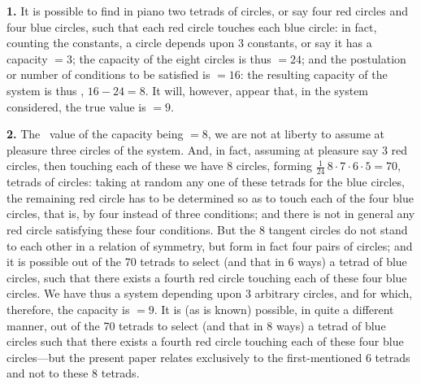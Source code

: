\documentclass[11pt,a4paper]{book}
\begin{document}
\textbf{1.} It is possible to find in piano two tetrads of circles, or say four red circles and four blue circles, such that each red circle touches each blue circle: in fact, counting the constants, a circle depends upon 3 constants, or say it has a capacity $=3$; the capacity of the eight circles is thus $=24$; and the postulation or number of conditions to be satisfied is $=16$: the resulting capacity of the system is thus \primd, $16-24=8$. It will, however, appear that, in the system considered, the true value is $=9$.

\textbf{2.} The \primd\ value of the capacity being $=8$, we are not at liberty to assume at pleasure three circles of the system. And, in fact, assuming at pleasure say 3 red circles, then touching each of these we have 8 circles, forming $\frac{1}{24}\, 8 \cdot 7 \cdot 6 \cdot 5 = 70$, tetrads of circles: taking at random any one of these tetrads for the blue circles, the remaining red circle has to be determined so as to touch each of the four blue circles, that is, by four instead of three conditions; and there is not in general any red circle satisfying these four conditions. But the 8 tangent circles do not stand to each other in a relation of symmetry, but form in fact four pairs of circles; and it is possible out of the 70 tetrads to select (and that in 6 ways) a tetrad of blue circles, such that there exists a fourth red circle touching each of these four blue circles. We have thus a system depending upon 3 arbitrary circles, and for which, therefore, the capacity is $=9$. It is (as is known) possible, in quite a different manner, out of the 70 tetrads to select (and that in 8 ways) a tetrad of blue circles such that there exists a fourth red circle touching each of these four blue circles---but the present paper relates exclusively to the first-mentioned 6 tetrads and not to these 8 tetrads.
\end{document}

